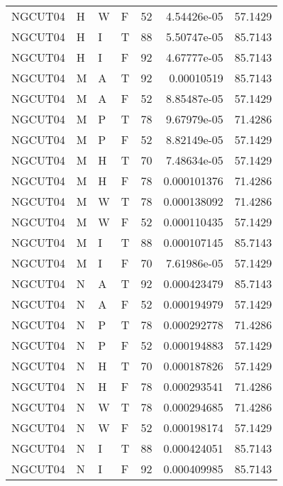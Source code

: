 \begin{table}[htb!]
{\begin{tabular}{llllrrr}
            NGCUT04  & H     & W     & F          & 52         & 4.54426e-05 & 57.1429  \\
            NGCUT04  & H     & I     & T          & 88         & 5.50747e-05 & 85.7143  \\
            NGCUT04  & H     & I     & F          & 92         & 4.67777e-05 & 85.7143  \\
            NGCUT04  & M     & A     & T          & 92         & 0.00010519  & 85.7143  \\
            NGCUT04  & M     & A     & F          & 52         & 8.85487e-05 & 57.1429  \\
            NGCUT04  & M     & P     & T          & 78         & 9.67979e-05 & 71.4286  \\
            NGCUT04  & M     & P     & F          & 52         & 8.82149e-05 & 57.1429  \\
            NGCUT04  & M     & H     & T          & 70         & 7.48634e-05 & 57.1429  \\
            NGCUT04  & M     & H     & F          & 78         & 0.000101376 & 71.4286  \\
            NGCUT04  & M     & W     & T          & 78         & 0.000138092 & 71.4286  \\
            NGCUT04  & M     & W     & F          & 52         & 0.000110435 & 57.1429  \\
            NGCUT04  & M     & I     & T          & 88         & 0.000107145 & 85.7143  \\
            NGCUT04  & M     & I     & F          & 70         & 7.61986e-05 & 57.1429  \\
            NGCUT04  & N     & A     & T          & 92         & 0.000423479 & 85.7143  \\
            NGCUT04  & N     & A     & F          & 52         & 0.000194979 & 57.1429  \\
            NGCUT04  & N     & P     & T          & 78         & 0.000292778 & 71.4286  \\
            NGCUT04  & N     & P     & F          & 52         & 0.000194883 & 57.1429  \\
            NGCUT04  & N     & H     & T          & 70         & 0.000187826 & 57.1429  \\
            NGCUT04  & N     & H     & F          & 78         & 0.000293541 & 71.4286  \\
            NGCUT04  & N     & W     & T          & 78         & 0.000294685 & 71.4286  \\
            NGCUT04  & N     & W     & F          & 52         & 0.000198174 & 57.1429  \\
            NGCUT04  & N     & I     & T          & 88         & 0.000424051 & 85.7143  \\
            NGCUT04  & N     & I     & F          & 92         & 0.000409985 & 85.7143  \\
            \hline
        \end{tabular}
    }{
    }
\end{table} 
